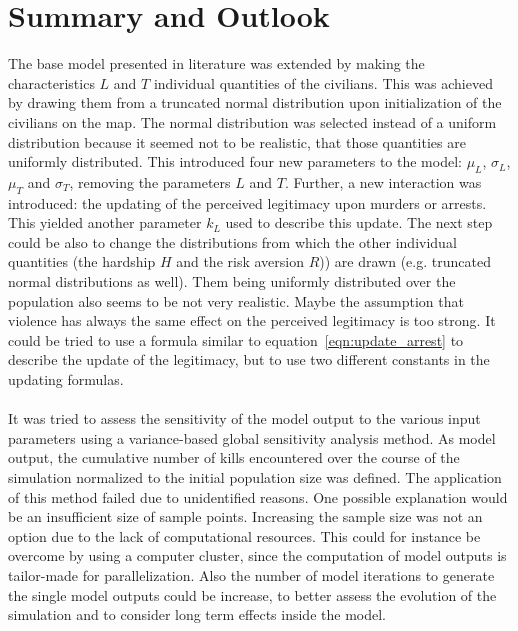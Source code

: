 \documentclass[11pt]{article}
\begin{document}
\section{Summary and Outlook}
The base model presented in literature was extended by making the characteristics $L$ and $T$ individual quantities of the civilians. This was achieved by drawing them from a truncated normal distribution upon initialization of the civilians on the map. The normal distribution was selected instead of a uniform distribution because it seemed not to be realistic, that those quantities are uniformly distributed. This introduced four new parameters to the model: $\mu_L$, $\sigma_L$, $\mu_T$ and $\sigma_T$, removing the parameters $L$ and $T$. Further, a new interaction was introduced: the updating of the perceived legitimacy upon murders or arrests. This yielded another parameter $k_L$ used to describe this update. The next step could be also to change the distributions from which the other individual quantities (the hardship $H$ and the risk aversion $R$)) are drawn (e.g. truncated normal distributions as well). Them being uniformly distributed over the population also seems to be not very realistic. Maybe the assumption that violence has always the same effect on the perceived legitimacy is too strong. It could be tried to use a formula similar to equation~\eqref{eqn:update_arrest} to describe the update of the legitimacy, but to use two different constants in the updating formulas.\\
\\
It was tried to assess the sensitivity of the model output to the various input parameters using a variance-based global sensitivity analysis method. As model output, the cumulative number of kills encountered over the course of the simulation normalized to the initial population size was defined. The application of this method failed due to unidentified reasons. One possible explanation would be an insufficient size of sample points. Increasing the sample size was not an option due to the lack of computational resources. This could for instance be overcome by using a computer cluster, since the computation of model outputs is tailor-made for parallelization. Also the number of model iterations to generate the single model outputs could be increase, to better assess the evolution of the simulation and to consider long term effects inside the model.\\
\\
\end{document}
